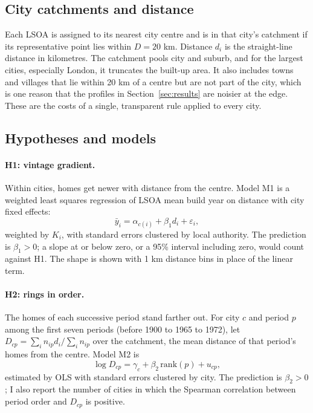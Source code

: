 \documentclass[11pt,a4paper]{article}
\begin{document}
\subsection{City catchments and distance}
Each LSOA is assigned to its nearest city centre and is in that city's catchment if its representative point lies within $D=20$ km. Distance $d_i$ is the straight-line distance in kilometres. The catchment pools city and suburb, and for the largest cities, especially London, it truncates the built-up area. It also includes towns and villages that lie within 20 km of a centre but are not part of the city, which is one reason that the profiles in Section~\ref{sec:results} are noisier at the edge. These are the costs of a single, transparent rule applied to every city.

\subsection{Hypotheses and models}
\paragraph{H1: vintage gradient.} Within cities, homes get newer with distance from the centre. Model M1 is a weighted least squares regression of LSOA mean build year on distance with city fixed effects:
\begin{equation}
\bar{y}_{i} = \alpha_{c(i)} + \beta_1 d_i + \varepsilon_i,
\end{equation}
weighted by $K_i$, with standard errors clustered by local authority. The prediction is $\beta_1>0$; a slope at or below zero, or a 95\% interval including zero, would count against H1. The shape is shown with 1 km distance bins in place of the linear term.

\paragraph{H2: rings in order.} The homes of each successive period stand farther out. For city $c$ and period $p$ among the first seven periods (before 1900 to 1965 to 1972), let $D_{cp}=\sum_i n_{ip} d_i/\sum_i n_{ip}$ over the catchment, the mean distance of that period's homes from the centre. Model M2 is
\begin{equation}
\log D_{cp} = \gamma_c + \beta_2\, \mathrm{rank}(p) + u_{cp},
\end{equation}
estimated by OLS with standard errors clustered by city. The prediction is $\beta_2>0$; I also report the number of cities in which the Spearman correlation between period order and $D_{cp}$ is positive.
\end{document}
